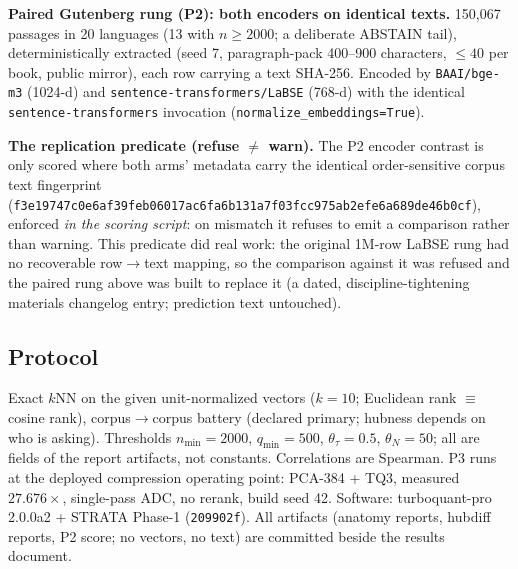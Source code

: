 \documentclass[11pt]{article}
\begin{document}
\textbf{Paired Gutenberg rung (P2): both encoders on identical texts.}
150{,}067 passages in 20 languages (13 with $n \ge 2000$; a deliberate
ABSTAIN tail), deterministically extracted (seed 7, paragraph-pack
400--900 characters, $\le 40$ per book, public mirror), each row carrying
a text SHA-256. Encoded by \texttt{BAAI/bge-m3} (1024-d) and
\texttt{sentence-transformers/LaBSE} (768-d) with the identical
\texttt{sentence-transformers} invocation
(\texttt{normalize\_embeddings=True}).

\textbf{The replication predicate (refuse $\ne$ warn).} The P2 encoder
contrast is only scored where both arms' metadata carry the identical
order-sensitive corpus text fingerprint
(\texttt{f3e19747c0e6af39feb06017ac6fa6b131a7f03fcc975ab2efe6a689de46b0cf}),
enforced \emph{in the scoring script}: on mismatch it refuses to emit a
comparison rather than warning. This predicate did real work: the original
1M-row LaBSE rung had no recoverable row$\to$text mapping, so the
comparison against it was refused and the paired rung above was built to
replace it (a dated, discipline-tightening materials changelog entry;
prediction text untouched).

\subsection{Protocol}
Exact $k$NN on the given unit-normalized vectors ($k = 10$; Euclidean rank
$\equiv$ cosine rank), corpus$\to$corpus battery (declared primary;
hubness depends on who is asking). Thresholds $n_{\min} = 2000$,
$q_{\min} = 500$, $\theta_\tau = 0.5$, $\theta_N = 50$; all are fields of
the report artifacts, not constants. Correlations are Spearman. P3 runs at
the deployed compression operating point: PCA-384 + TQ3, measured
$27.676\times$, single-pass ADC, no rerank, build seed 42. Software:
turboquant-pro 2.0.0a2 + STRATA Phase-1 (\texttt{209902f}). All artifacts
(anatomy reports, hubdiff reports, P2 score; no vectors, no text) are
committed beside the results document.
\end{document}

